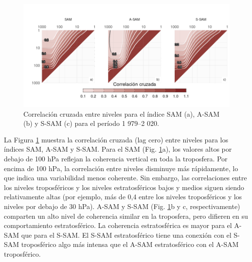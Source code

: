 \documentclass[12pt,oneside,a4paper]{reedthesis}
\begin{document}
\begin{figure}

{\centering \includegraphics{figures/30-sam/cross-correlation-1} 

}

\caption{Correlación cruzada entre niveles para el índice SAM (a), A-SAM (b) y S-SAM (c) para el período 1 979--2 020.}\label{fig:cross-correlation}
\end{figure}

La Figura \ref{fig:cross-correlation} muestra la correlación cruzada (lag cero) entre niveles para los índices SAM, A-SAM y S-SAM.
Para el SAM (Fig. \ref{fig:cross-correlation}a), los valores altos por debajo de 100 hPa reflejan la coherencia vertical en toda la troposfera.
Por encima de 100 hPa, la correlación entre niveles disminuye más rápidamente, lo que indica una variabilidad menos coherente.
Sin embargo, las correlaciones entre los niveles troposféricos y los niveles estratosféricos bajos y medios siguen siendo relativamente altas (por ejemplo, más de 0,4 entre los niveles troposféricos y los niveles por debajo de 30 hPa).
A-SAM y S-SAM (Fig. \ref{fig:cross-correlation}b y c, respectivamente) comparten un alto nivel de coherencia similar en la troposfera, pero difieren en su comportamiento estratosférico.
La coherencia estratosférica es mayor para el A-SAM que para el S-SAM.
El S-SAM estratosférico tiene una conexión con el S-SAM troposférico algo más intensa que el A-SAM estratosférico con el A-SAM troposférico.
\end{document}
